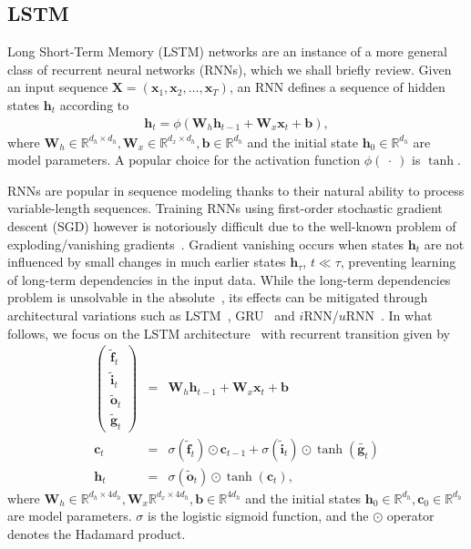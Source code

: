 \documentclass{article} %
\newcommand{\vect}[1]{\mathbf{#1}}
\newcommand{\mat}[1]{\mathbf{#1}}
\newcommand{\ewprod}{\odot}
\newcommand{\reals}{\mathbb{R}}
\begin{document}
\subsection{LSTM}

Long Short-Term Memory (LSTM) networks are an instance of a more general class of recurrent neural networks (RNNs),
which we shall briefly review.
Given an input sequence $\mat{X} = ( \vect{x}_1, \vect{x}_2, \ldots, \vect{x}_T )$,
an RNN defines a sequence of hidden states $\vect{h}_t$ according to
\begin{eqnarray}
  \vect{h}_t = \phi(\mat{W}_h \vect{h}_{t-1} + \mat{W}_x  \vect{x}_t + \vect{b}),
\end{eqnarray}
where $\mat{W}_h \in \reals^{d_h \times d_h}, \mat{W}_x \in \reals^{d_x \times d_h}, \vect{b} \in \reals^{d_h}$
and the initial state $\vect{h}_0 \in \reals^{d_h}$ %
are model parameters.
A popular choice for the activation function $\phi(\ \cdot\ )$ is $\tanh$.

RNNs are popular in sequence modeling thanks to their natural ability to process variable-length sequences.
Training RNNs using first-order stochastic gradient descent (SGD) however is notoriously difficult
due to the well-known problem of exploding/vanishing gradients~\cite{bengio1994learning,hochreiter1991untersuchungen,pascanudifficulty}.
Gradient vanishing occurs when states $\vect{h}_t$ are not influenced by small changes in much earlier states $\vect{h}_{\tau}$, $t \ll \tau$,
preventing learning of long-term dependencies in the input data.
While the long-term dependencies problem is unsolvable in the absolute~\cite{bengio1994learning},
its effects can be mitigated through architectural variations such as LSTM~\cite{lstm}, GRU~\cite{cho2014learning} and $i$RNN/$u$RNN~\cite{le2015simple,urnn}.
In what follows, we focus on the LSTM architecture~\cite{lstm} with recurrent transition given by
\begin{eqnarray}
\left(\begin{array}{ccc}
\tilde{\vect{f}}_t \\
\tilde{\vect{i}}_t \\
\tilde{\vect{o}}_t \\
\tilde{\vect{g}}_t
\end{array}\right)
 &=&
 \mat{W}_h \vect{h}_{t-1} +
 \mat{W}_x \vect{x}_t +
 \vect{b}
 \\
\vect{c}_t &= &\sigma(\tilde{\vect{f}}_t) \ewprod \vect{c}_{t-1} +
\sigma(\tilde{\vect{i}}_t) \ewprod \tanh(\tilde{\vect{g}_t}) \\
\vect{h}_t &= &\sigma(\tilde{\vect{o}}_t) \ewprod \tanh(\vect{c}_t),
\end{eqnarray}
where $\vect{W}_h \in \reals^{d_h \times 4 d_h}, \vect{W}_x \reals^{d_x \times 4 d_h}, \vect{b} \in \reals^{4 d_h}$
and the initial states $\vect{h}_0 \in \reals^{d_h}, \vect{c}_0 \in \reals^{d_h}$ %
are model parameters.
$\sigma$ is the logistic sigmoid function, and the $\ewprod$ operator denotes the Hadamard product.
\end{document}
